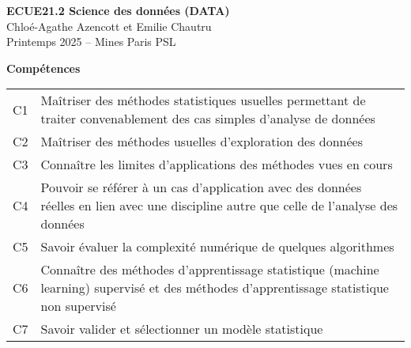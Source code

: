 \documentclass[french,11pt,openany]{book}
\begin{document}
\pagestyle{empty}
\setlength{\abovedisplayskip}{5pt}
\setlength{\belowdisplayskip}{3pt}


\renewcommand{\bibname}{}

\begin{center}
  
  \hfill

  \vfill
  
  {\huge \bfseries
  ECUE21.2 Science des données (DATA)}\\[1em]
  
  \Large
  Chloé-Agathe Azencott  et Emilie Chautru \\[1em]

  Printemps 2025 -- Mines Paris PSL

  \vfill

  
  \textbf{Compétences} 

\large
\begin{table}[H]\captionsetup{labelformat=empty} 
	\centering
	\begin{tabular}{p{}p{}} \toprule[1.5pt] 
    C1 & Maîtriser des méthodes statistiques usuelles permettant de traiter convenablement des cas simples d'analyse de données \\ 
C2 & Maîtriser des méthodes usuelles d'exploration des données \\ 
C3 &  Connaître les limites d'applications des méthodes vues en cours \\ 
C4 & Pouvoir se référer à un cas d'application avec des données réelles en lien avec une discipline autre que celle de l'analyse des données \\ 
C5 & Savoir évaluer la complexité numérique de quelques algorithmes \\ 
C6 & Connaître des méthodes d'apprentissage statistique (machine learning) supervisé et des méthodes d'apprentissage statistique non supervisé \\ 
C7 & Savoir valider et sélectionner un modèle statistique \\ 
\bottomrule[1.5pt]
	\end{tabular}
\end{table}

  \vfill

\end{center}

\cleardoublepage
\pagestyle{fancy}
\tableofcontents
\cleardoublepage
\end{document}
